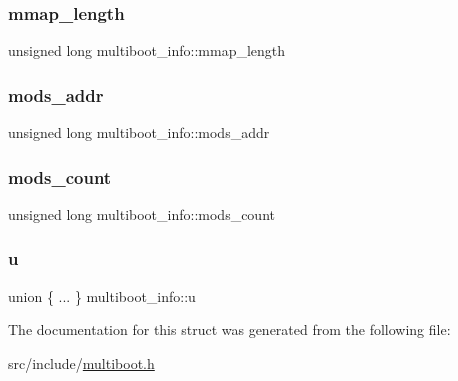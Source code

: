 \subsubsection{\texorpdfstring{mmap\+\_\+length}{mmap\_length}}
{\footnotesize\ttfamily unsigned long multiboot\+\_\+info\+::mmap\+\_\+length}

\mbox{\label{structmultiboot__info_a6cf0a1bab49c3f04870ce3ded4651fca}} 
\subsubsection{\texorpdfstring{mods\+\_\+addr}{mods\_addr}}
{\footnotesize\ttfamily unsigned long multiboot\+\_\+info\+::mods\+\_\+addr}

\mbox{\label{structmultiboot__info_a13052f0e072cf2b88f92a2f8c93332a0}} 
\subsubsection{\texorpdfstring{mods\+\_\+count}{mods\_count}}
{\footnotesize\ttfamily unsigned long multiboot\+\_\+info\+::mods\+\_\+count}

\mbox{\label{structmultiboot__info_a61dc20144c958a07801f479c74e5867e}} 
\subsubsection{\texorpdfstring{u}{u}}
{\footnotesize\ttfamily union \{ ... \}   multiboot\+\_\+info\+::u}



The documentation for this struct was generated from the following file\+:\begin{DoxyCompactItemize}
\item 
src/include/\hyperlink{multiboot_8h}{multiboot.\+h}\end{DoxyCompactItemize}
